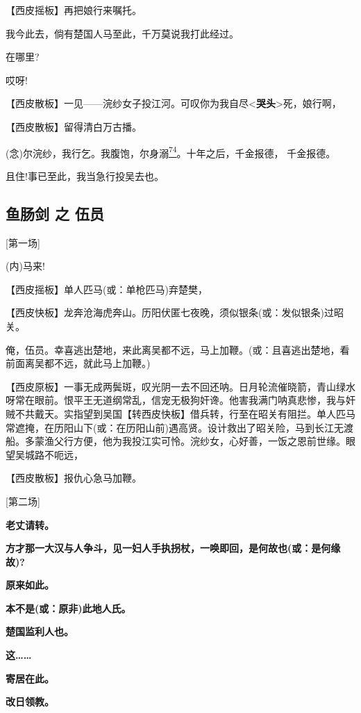 【西皮摇板】再把娘行来嘱托。

我今此去，倘有楚国人马至此，千万莫说我打此经过。

在哪里?

哎呀!

【西皮散板】一见------浣纱女子投江河。可叹你为我自尽\textless{}\textbf{哭头}\textgreater{}死，娘行啊，

【西皮散板】留得清白万古播。

(念)尔浣纱，我行乞。我腹饱，尔身溺\protect\hyperlink{fn74}{\textsuperscript{74}}。十年之后，千金报德，
千金报德。

且住!事已至此，我当急行投吴去也。

\newpage
\hypertarget{ux9c7cux80a0ux5251-ux4e4b-ux4f0dux5458}{%
\subsection{鱼肠剑 之
伍员}\label{ux9c7cux80a0ux5251-ux4e4b-ux4f0dux5458}}

{[}第一场{]}

(内)马来!

【西皮摇板】单人匹马(或：单枪匹马)弃楚樊，

【西皮快板】龙奔沧海虎奔山。历阳伏匿七夜晚，须似银条(或：发似银条)过昭关。

俺，伍员。幸喜逃出楚地，来此离吴都不远，马上加鞭。(或：且喜逃出楚地，看前面离吴都不远，就此马上加鞭。)

【西皮原板】一事无成两鬓斑，叹光阴一去不回还呐。日月轮流催晓箭，青山绿水呀常在眼前。恨平王无道纲常乱，信宠无极狗奸谗。他害我满门呐真悲惨，我与奸贼不共戴天。实指望到吴国【转西皮快板】借兵转，行至在昭关有阻拦。单人匹马常遮掩，在历阳山下(或：在历阳山前)遇高贤。设计救出了昭关险，马到长江无渡船。多蒙渔父行方便，他为我投江实可怜。浣纱女，心好善，一饭之恩前世缘。眼望吴城路不呃远，

【西皮散板】报仇心急马加鞭。

{[}第二场{]}

\textbf{老丈请转。}

\textbf{方才那一大汉与人争斗，见一妇人手执拐杖，一唤即回，是何故也(或：是何缘故)?}

\textbf{原来如此。}

\textbf{本不是(或：原非)此地人氏。}

\textbf{楚国监利人也。}

\textbf{这\ldots{}\ldots{}}

\textbf{寄居在此。}

\textbf{改日领教。}

